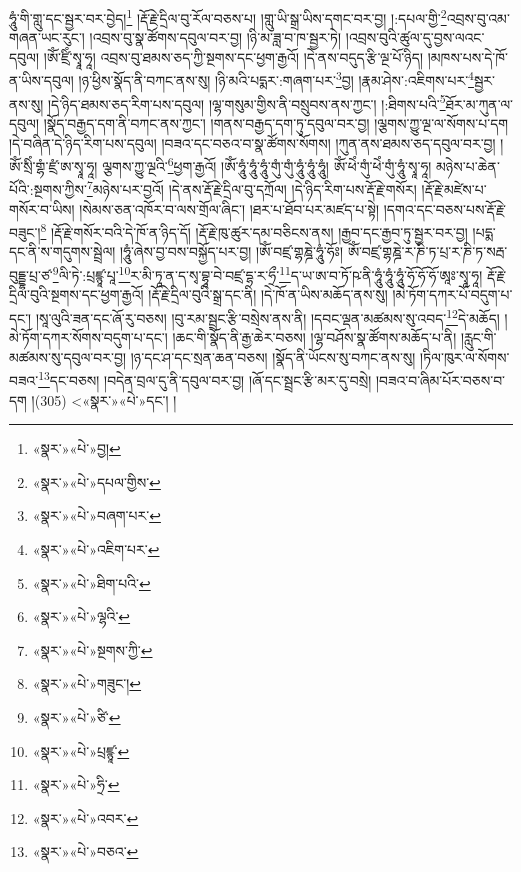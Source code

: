ཧཱུཾ་གི་གླུ་དང་སྦྱར་བར་བྱེད།\footnote{«སྣར་»«པེ་»བྱ།} །རྡོ་རྗེ་དྲིལ་བུ་རོལ་བཅས་པ། །གླུ་ཡི་སྒྲ་ཡིས་དགང་བར་བྱ། །:དཔལ་གྱི་\footnote{«སྣར་»«པེ་»དཔལ་གྱིས་}འབྲས་བུ་འམ་གཞན་ཡང་རུང་། །འབྲས་བུ་སྣ་ཚོགས་དབུལ་བར་བྱ། །ཉི་མ་ཟླ་བ་ཁ་སྦྱར་ཏེ། །འབྲས་བུའི་ཚུལ་དུ་བྱས་ལའང་དབུལ། །ཨོཾ་ཛྲིཾ་སྭཱ་ཧཱ། འབྲས་བུ་ཐམས་ཅད་ཀྱི་སྔགས་དང་ཕྱག་རྒྱའོ། །དེ་ནས་བདུད་རྩི་ལྔ་པོ་ཉིད། །མཁས་པས་དེ་ཁོ་ན་ཡིས་དབུལ། །ཉ་ཕྱིས་སྣོད་ནི་བཀང་ནས་སུ། །ཉི་མའི་པདྨར་:གཞག་པར་\footnote{«སྣར་»«པེ་»བཞག་པར་}བྱ། །རྣམ་ཤེས་:འཇིགས་པར་\footnote{«སྣར་»«པེ་»འཇིག་པར་}སྦྱར་ནས་སུ། །དེ་ཉིད་ཐམས་ཅད་རིག་པས་དབུལ། །ལྷ་གསུམ་གྱིས་ནི་བསྲུབས་ནས་ཀྱང་། །:ཐིགས་པའི་\footnote{«སྣར་»«པེ་»ཐིག་པའི་}ཐོར་མ་ཀུན་ལ་དབུལ། །སྣོད་བརྒྱད་དག་ནི་བཀང་ནས་ཀྱང་། །གནས་བརྒྱད་དག་ཏུ་དབུལ་བར་བྱ། །ལྕགས་ཀྱུ་ལྔ་ལ་སོགས་པ་དག །དེ་བཞིན་དེ་ཉིད་རིག་པས་དབུལ། །བཟའ་དང་བཅའ་བ་སྣ་ཚོགས་སོགས། །ཀུན་ནས་ཐམས་ཅད་དབུལ་བར་བྱ། །ཨོཾ་སྲིཾ་གྷཾ་ཛྲཾ་ཨ་སྭཱ་ཧཱ། ལྕགས་ཀྱུ་ལྔའི་\footnote{«སྣར་»«པེ་»ལྷའི་}ཕྱག་རྒྱའོ། །ཨོཾ་ཧཱུཾ་ཧཱུཾ་ཧཱུཾ་གུཾ་གུཾ་ཧཱུཾ་ཧཱུཾ་ཧཱུཾ། ཨོཾ་ཕེཾ་གུཾ་ཕེཾ་གུཾ་ཧཱུཾ་སྭཱ་ཧཱ། མཉེས་པ་ཆེན་པོའི་:སྔགས་ཀྱིས་\footnote{«སྣར་»«པེ་»སྔགས་ཀྱི་}མཉེས་པར་བྱའོ། །དེ་ནས་རྡོ་རྗེ་དྲིལ་བུ་དཀྲོལ། །དེ་ཉིད་རིག་པས་རྡོ་རྗེ་གསོར། །རྡོ་རྗེ་མཛེས་པ་གསོར་བ་ཡིས། །སེམས་ཅན་འཁོར་བ་ལས་གྲོལ་ཞིང་། །ཐར་པ་ཐོབ་པར་མཛད་པ་སྟེ། །དགའ་དང་བཅས་པས་རྡོ་རྗེ་བཟུང་།\footnote{«སྣར་»«པེ་»གཟུང་།} །རྡོ་རྗེ་གསོར་བའི་དེ་ཁོ་ན་ཉིད་དོ། །རྡོ་རྗེ་ཁུ་ཚུར་དམ་བཅིངས་ནས། །རྒྱབ་དང་རྒྱབ་ཏུ་སྦྱར་བར་བྱ། །པདྨ་དང་ནི་ས་གདུགས་སྦྲེལ། །ཧཱུཾ་ཞེས་བྱ་བས་བསྐྱོད་པར་བྱ། །ཨོཾ་བཛྲ་གྷཎྜེ་ཧཱུཾ་ཧོཿ། ཨོཾ་བཛྲ་གྷཎྜེ་ར་ཎི་ཏ་པྲ་ར་ཎི་ཏ་སརྦ་བུདྡྷ་པྲ་ཙ་\footnote{«སྣར་»«པེ་»ཙི་}ལི་ཏེ་:པྲཛྙཱ་པཱ་\footnote{«སྣར་»«པེ་»པྲཛྙཱ་}ར་མི་ཏཱ་ན་ད་སྭ་བྷཱ་བེ་བཛྲ་དྷ་ར་ཧྲྀ་\footnote{«སྣར་»«པེ་»ཧྲི་}ད་ཡ་ཨ་བ་ཏོ་ཥ་ནི་ཧཱུཾ་ཧཱུཾ་ཧཱུཾ་ཧོ་ཧོ་ཧོ་ཨཱཿ་སྭཱ་ཧཱ། རྡོ་རྗེ་དྲིལ་བུའི་སྔགས་དང་ཕྱག་རྒྱའོ། །རྡོ་རྗེ་དྲིལ་བུའི་སྒྲ་དང་ནི། །དེ་ཁོ་ན་ཡིས་མཆོད་ནས་སུ། །མེ་ཏོག་དཀར་པོ་བདུག་པ་དང་། །སཱ་ལུའི་ཟན་དང་ཞོ་རུ་བཅས། །བུ་རམ་སྦྲང་རྩི་བསྲེས་ནས་ནི། །དབང་ལྡན་མཚམས་སུ་འབད་\footnote{«སྣར་»«པེ་»འབར་}དེ་མཆོད། །མེ་ཏོག་དཀར་སོགས་བདུག་པ་དང་། །ཆང་གི་སྣོད་ནི་རྒྱ་ཆེར་བཅས། །ལྷ་བཤོས་སྣ་ཚོགས་མཆོད་པ་ནི། །རླུང་གི་མཚམས་སུ་དབུལ་བར་བྱ། །ཉ་དང་ཤ་དང་སྲན་ཆན་བཅས། །སྣོད་ནི་ཡོངས་སུ་བཀང་ནས་སུ། །ཏིལ་ཁུར་ལ་སོགས་བཟའ་\footnote{«སྣར་»«པེ་»བཅའ་}དང་བཅས། །བདེན་བྲལ་དུ་ནི་དབུལ་བར་བྱ། །ཞོ་དང་སྦྲང་རྩི་མར་དུ་བསྲེ། །བཟའ་བ་ཞིམ་པོར་བཅས་བ་དག །(305) <«སྣར་»«པེ་»དང་། །

